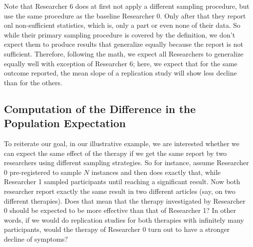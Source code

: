 \documentclass[man]{apa7}
\theoremstyle{definition}
\begin{document}
Note that Researcher 6 does at first not apply a different sampling procedure, but use the same procedure as the baseline Researcher 0. %
Only after that they report onl non-sufficient statistics, which is, only a part or even none of their data. So while their primary sampling procedure is covered by the definition, we don't expect them to produce results that generalize equally because the report is not sufficient. Therefore, following the math, we expect all Researchers to generalize equally well with exception of Researcher 6; here, we expect that for the same outcome reported, the mean slope of a replication study will show less decline than for the others. 

\subsection{Computation of the Difference in the Population Expectation}
To reiterate our goal, in our illustrative example, we are interested whether we can expect the same effect of the therapy if we get the same report by two researchers using different sampling strategies. So for instance, assume Researcher 0 pre-registered to sample $N$ instances and then does exactly that, while Researcher 1 sampled participants until reaching a significant result. Now both researcher report exactly the same result in two different articles (say, on two different therapies). Does that mean that the therapy investigated by Researcher 0 should be expected to be more effective than that of Researcher 1? In other words, if we would do replication studies for both therapies with infinitely many participants, would the therapy of Researcher 0 turn out to have a stronger decline of symptoms? 
\end{document}
